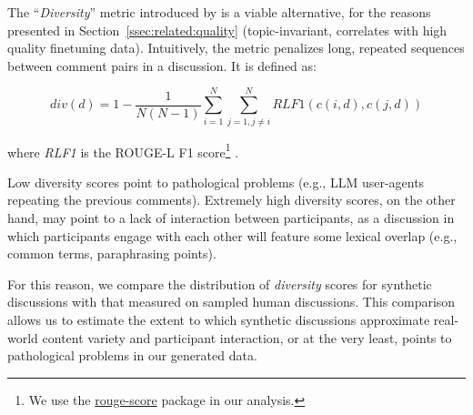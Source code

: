 The “\textit{Diversity}” metric introduced by \citet{ulmer2024} is a viable alternative, for the reasons presented in Section~\ref{ssec:related:quality} (topic-invariant, correlates with high quality finetuning data). Intuitively, the metric penalizes long, repeated sequences between comment pairs in a discussion. It is defined as:

\small
\begin{equation}
\label{eq:variety}
    div(d) = 1- \frac{1}{N(N-1)} \sum_{i=1}^N \sum_{j=1, j \neq i}^N \textit{RLF1}(c(i, d), c(j, d))
\end{equation}
\normalsize

\noindent where \textit{RLF1} is the ROUGE-L F1 score\footnote{We use the \href{https://pypi.org/project/rouge-score}{rouge-score} package in our analysis.} \cite{lin-2004-rouge}. 

Low diversity scores point to pathological problems (e.g., \ac{LLM} user-agents repeating the previous comments). Extremely high diversity scores, on the other hand, may point to a lack of interaction between participants, as a discussion in which participants engage with each other will feature some lexical overlap (e.g., common terms, paraphrasing points).%

For this reason, we compare the distribution of \textit{diversity} scores for synthetic discussions with that measured on sampled human discussions. This comparison allows us to estimate the extent to which synthetic discussions approximate real-world content variety and participant interaction, or at the very least, points to pathological problems in our generated data.